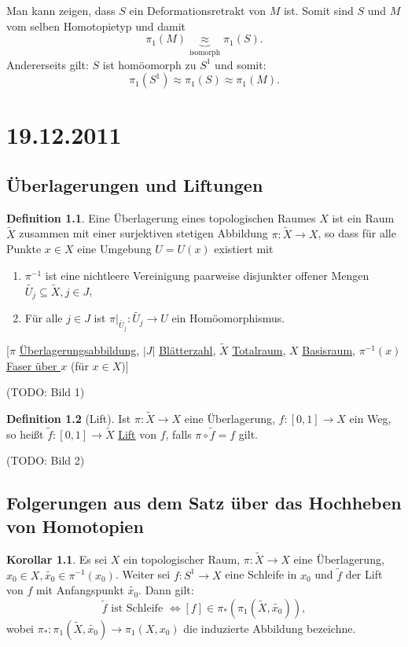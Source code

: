 \documentclass[a4paper,11pt,notitlepage]{report}
\theoremstyle{definition}
\newtheorem{definition}{Definition}[chapter]
\newtheorem{corollary}{Korollar}[chapter]
\begin{document}
Man kann zeigen, dass $S$ ein Deformationsretrakt von $M$ ist.
\newline
Somit sind $S$ und $M$ vom selben Homotopietyp und damit $$\pi_1(M) \underbrace{\approx}_{\text{isomorph}} \pi_1(S).$$
Andererseits gilt: $S$ ist homöomorph zu $S^1$ und somit: 
$$\pi_1(S^1) \approx \pi_1(S) \approx \pi_1(M).$$

\chapter{19.12.2011}
\section{Überlagerungen und Liftungen}

\begin{definition}
	Eine Überlagerung eines topologischen Raumes $X$ ist ein Raum $\widetilde{X}$ zusammen mit einer surjektiven stetigen Abbildung $\pi \colon \widetilde{X} \rightarrow X$, so dass für alle Punkte $x \in X$ eine Umgebung $U=U(x)$ existiert mit
	\begin{enumerate}
		\item $\pi^{-1}$ ist eine nichtleere Vereinigung paarweise disjunkter offener Mengen $\widetilde{U_j} \subseteq \widetilde{X}, j \in J$,
		\item Für alle $j \in J$ ist $\pi \big |_{\widetilde{U_j}} \colon \widetilde{U_j} \rightarrow U$ ein Homöomorphismus.
	\end{enumerate}
\end{definition}

[$\pi$ \underline{Überlagerungsabbildung}, $|J|$ \underline{Blätterzahl}, $\widetilde{X}$ \underline{Totalraum}, $X$ \underline{Basisraum}, $\pi^{-1}(x)$ \underline{Faser über $x$} (für $x \in X$)]

(TODO: Bild 1)
\newline
\begin{definition}[Lift]
	Ist $\pi \colon \widetilde{X} \rightarrow X$ eine Überlagerung, $f \colon [0,1] \rightarrow X$ ein Weg, so heißt $\widetilde{f} \colon [0,1] \rightarrow \widetilde{X}$ \underline{Lift} von $f$, falls $\pi \circ \widetilde{f} = f$ gilt.
\end{definition}
(TODO: Bild 2)
\newline

\section{Folgerungen aus dem Satz über das Hochheben von Homotopien}
\begin{corollary}
	Es sei $X$ ein topologischer Raum, $\pi \colon \widetilde{X} \rightarrow X$ eine Überlagerung, $x_0 \in X, \widetilde{x_0} \in \pi^{-1}(x_0)$. Weiter sei $f \colon S^1 \rightarrow X$ eine Schleife in $x_0$ und $\widetilde{f}$ der Lift von $f$ mit Anfangspunkt $\widetilde{x_0}$. Dann gilt:
	$$\widetilde{f} \text{ ist Schleife } \Leftrightarrow [f] \in \pi_*(\pi_1(\widetilde{X}, \widetilde{x_0})),$$
	wobei $\pi_* \colon \pi_1(\widetilde{X}, \widetilde{x_0}) \rightarrow \pi_1(X,x_0)$ die induzierte Abbildung bezeichne.
\end{corollary}
\end{document}
